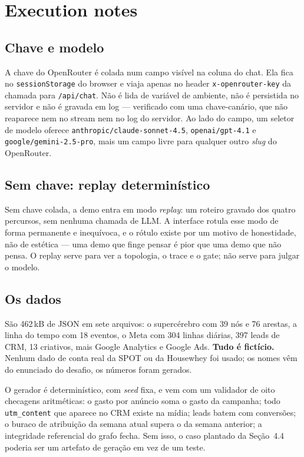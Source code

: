 \documentclass[10pt,twocolumn]{article}
\newcommand{\code}[1]{\texttt{\footnotesize #1}}
\begin{document}
\section{Execution notes}

\subsection{Chave e modelo}

A chave do OpenRouter é colada num campo visível na coluna do chat. Ela fica no
\code{sessionStorage} do browser e viaja apenas no header \code{x-openrouter-key} da chamada
para \code{/api/chat}. Não é lida de variável de ambiente, não é persistida no servidor e
não é gravada em log --- verificado com uma chave-canário, que não reaparece nem no stream
nem no log do servidor. Ao lado do campo, um seletor de modelo oferece
\code{anthropic/claude-sonnet-4.5}, \code{openai/gpt-4.1} e \code{google/gemini-2.5-pro},
mais um campo livre para qualquer outro \emph{slug} do OpenRouter.

\subsection{Sem chave: replay determinístico}

Sem chave colada, a demo entra em modo \emph{replay}: um roteiro gravado dos quatro
percursos, sem nenhuma chamada de LLM. A interface rotula esse modo de forma permanente e
inequívoca, e o rótulo existe por um motivo de honestidade, não de estética --- uma demo que
finge pensar é pior que uma demo que não pensa. O replay serve para ver a topologia, o
trace e o gate; não serve para julgar o modelo.

\subsection{Os dados}

São 462\,kB de JSON em sete arquivos: o supercérebro com 39 nós e 76 arestas, a linha do
tempo com 18 eventos, o Meta com 304 linhas diárias, 397 leads de CRM, 13 criativos, mais
Google Analytics e Google Ads. \textbf{Tudo é fictício.} Nenhum dado de conta real da SPOT
ou da Housewhey foi usado; os nomes vêm do enunciado do desafio, os números foram gerados.

O gerador é determinístico, com \emph{seed} fixa, e vem com um validador de oito checagens
aritméticas: o gasto por anúncio soma o gasto da campanha; todo \code{utm\_content} que
aparece no CRM existe na mídia; leads batem com conversões; o buraco de atribuição da semana
atual supera o da semana anterior; a integridade referencial do grafo fecha. Sem isso, o
caso plantado da Seção~4.4 poderia ser um artefato de geração em vez de um teste.
\end{document}
